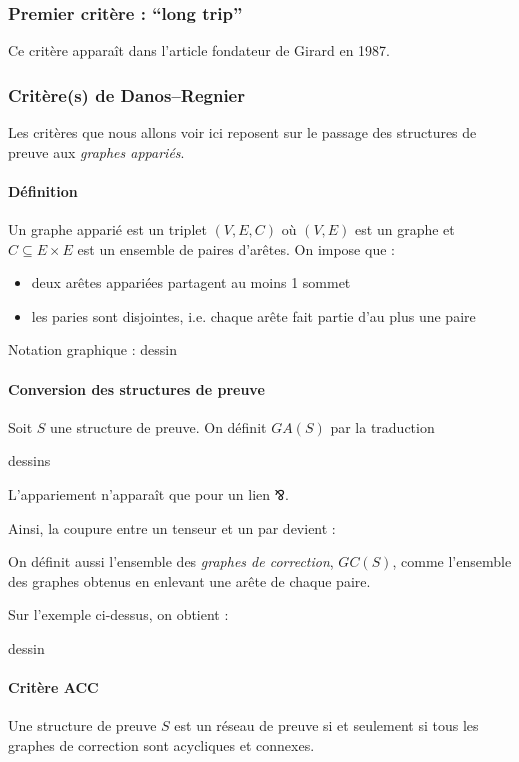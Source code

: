 \documentclass[a4paper, 11pt]{article}
\newcommand{\parr}{\mathbin{⅋}}
\begin{document}
\subsubsection{Premier critère : \enquote{long trip}}

Ce critère apparaît dans l'article fondateur de Girard en 1987.


\subsubsection{Critère(s) de Danos--Regnier}

Les critères que nous allons voir ici reposent sur le passage des structures de preuve aux \emph{graphes appariés}.

\paragraph{Définition} Un graphe apparié est un triplet $(V, E, C)$ où $(V,E)$ est un graphe et $C \subseteq E \times E$ est un ensemble de paires d'arêtes. On impose que :
\begin{itemize}
\item deux arêtes appariées partagent au moins 1 sommet
\item les paries sont disjointes, i.e. chaque arête fait partie d'au plus une paire
\end{itemize}
Notation graphique : dessin

\paragraph{Conversion des structures de preuve} Soit $S$ une structure de preuve. On définit $GA(S)$ par la traduction

dessins

L'appariement n'apparaît que pour un lien $\parr$.

Ainsi, la coupure entre un tenseur et un par devient :

On définit aussi l'ensemble des \emph{graphes de correction}, $GC(S)$, comme l'ensemble des graphes obtenus en enlevant une arête de chaque paire.

Sur l'exemple ci-dessus, on obtient :

dessin

\paragraph{Critère ACC} Une structure de preuve $S$ est un réseau de preuve si et seulement si tous les graphes de correction sont acycliques et connexes.
\end{document}
